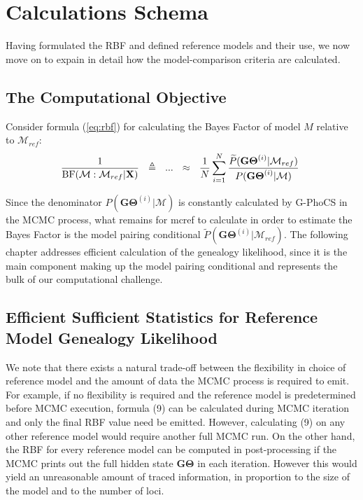 \documentclass[11pt]{article}
\newcommand{\vect}[1]{\boldsymbol{\mathbf{#1}}}
\newcommand{\X}{\vect{X}}
\newcommand{\M}{\mathcal{M}}
\newcommand{\G}{\vect{G}}
\newcommand{\T}{\vect{\Theta}}
\newcommand{\GT}{\G\T}
\newcommand{\Mref}{\M_{ref}}
\newcommand{\Pref}{\widetilde{P}}
\newcommand{\rbf}{\text{BF}}
\newcommand{\1}{\mathbbm{1}}
\newcommand{\gp}{G-PhoCS }
\begin{document}
\section{Calculations Schema}

Having formulated the RBF and defined reference models and their use, we now move on to expain in detail how the model-comparison criteria are calculated.

\subsection{The Computational Objective}

Consider formula (\ref{eq:rbf}) for calculating the Bayes Factor of model $M$ relative to $\Mref$:
%
%
\begin{equation}
 \frac{1}{\rbf(\M:\Mref|\X)} ~~\triangleq~~ ...  ~~\approx~~ \frac{1}{N} \sum_{i=1}^{N}\frac{\Pref(\GT^{(i)}|\Mref) }{P(\GT^{(i)}|\M)} ~ 
 \notag
\end{equation}

Since the denominator $P(\GT^{(i)}|\M)$ is constantly calculated by \gp in the MCMC process, what remains for mcref to calculate in order to estimate the Bayes Factor is the model pairing conditional $\Pref(\GT^{(i)}|\Mref)$. The following chapter addresses efficient calculation of the genealogy likelihood, since it is the main component making up the model pairing conditional and represents the bulk of our computational challenge.\\


\subsection{Efficient Sufficient Statistics for Reference Model Genealogy Likelihood}


We note that there exists a natural trade-off between the flexibility in choice of reference model and the amount of data the MCMC process is required to emit. For example, if no flexibility is required and the reference model is predetermined before MCMC execution, formula (9) can be calculated during MCMC iteration and only the final RBF value need be emitted. However, calculating (9) on any other reference model would require another full MCMC run.
%
On the other hand, the RBF for every reference model can be computed in post-processing if the MCMC prints out the full hidden state $\GT$ in each iteration.
%
However this would yield an unreasonable amount of traced information, in proportion to the size of the model and to the number of loci.
\end{document}
